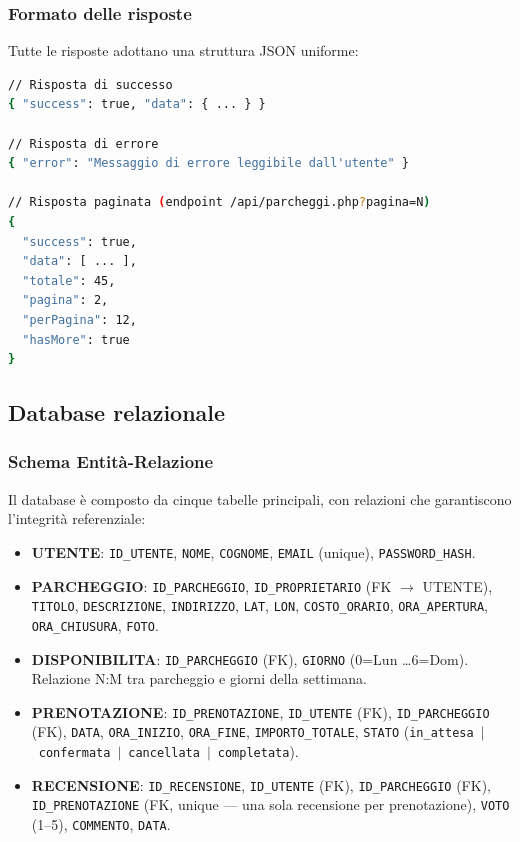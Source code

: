 \documentclass[12pt, a4paper]{article}
\begin{document}
\subsubsection{Formato delle risposte}

Tutte le risposte adottano una struttura JSON uniforme:

\begin{lstlisting}[language=bash, caption={Struttura delle risposte API — successo ed errore.}]
// Risposta di successo
{ "success": true, "data": { ... } }

// Risposta di errore
{ "error": "Messaggio di errore leggibile dall'utente" }

// Risposta paginata (endpoint /api/parcheggi.php?pagina=N)
{
  "success": true,
  "data": [ ... ],
  "totale": 45,
  "pagina": 2,
  "perPagina": 12,
  "hasMore": true
}
\end{lstlisting}

\subsection{Database relazionale}

\subsubsection{Schema Entità-Relazione}

Il database è composto da cinque tabelle principali, con relazioni che garantiscono
l'integrità referenziale:

\begin{itemize}
    \item \textbf{UTENTE}: \texttt{ID\_UTENTE}, \texttt{NOME}, \texttt{COGNOME},
    \texttt{EMAIL} (unique), \texttt{PASSWORD\_HASH}.

    \item \textbf{PARCHEGGIO}: \texttt{ID\_PARCHEGGIO}, \texttt{ID\_PROPRIETARIO}
    (FK $\to$ UTENTE), \texttt{TITOLO}, \texttt{DESCRIZIONE}, \texttt{INDIRIZZO},
    \texttt{LAT}, \texttt{LON}, \texttt{COSTO\_ORARIO}, \texttt{ORA\_APERTURA},
    \texttt{ORA\_CHIUSURA}, \texttt{FOTO}.

    \item \textbf{DISPONIBILITA}: \texttt{ID\_PARCHEGGIO} (FK), \texttt{GIORNO}
    (0=Lun \ldots 6=Dom). Relazione N:M tra parcheggio e giorni della settimana.

    \item \textbf{PRENOTAZIONE}: \texttt{ID\_PRENOTAZIONE}, \texttt{ID\_UTENTE} (FK),
    \texttt{ID\_PARCHEGGIO} (FK), \texttt{DATA}, \texttt{ORA\_INIZIO},
    \texttt{ORA\_FINE}, \texttt{IMPORTO\_TOTALE}, \texttt{STATO}
    (\texttt{in\_attesa}~$|$~\texttt{confermata}~$|$~\texttt{cancellata}~$|$~\texttt{completata}).

    \item \textbf{RECENSIONE}: \texttt{ID\_RECENSIONE}, \texttt{ID\_UTENTE} (FK),
    \texttt{ID\_PARCHEGGIO} (FK), \texttt{ID\_PRENOTAZIONE} (FK, unique — una
    sola recensione per prenotazione), \texttt{VOTO} (1--5), \texttt{COMMENTO},
    \texttt{DATA}.
\end{itemize}
\end{document}
